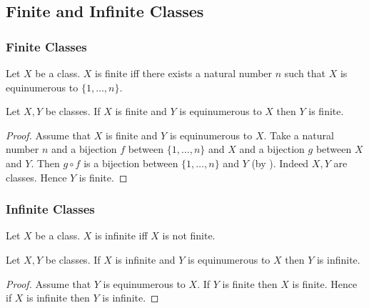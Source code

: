 \documentclass[10pt]{article}
\begin{document}
  \subsection*{Finite and Infinite Classes}

  \subsubsection*{Finite Classes}

  \begin{forthel}
    \begin{definition}
      Let $X$ be a class.
      $X$ is finite iff there exists a natural number $n$ such that $X$ is equinumerous to $\{ 1, \dots, n \}$.
    \end{definition}
  \end{forthel}

  \begin{forthel}
    \begin{proposition}
      Let $X, Y$ be classes.
      If $X$ is finite and $Y$ is equinumerous to $X$ then $Y$ is finite.
    \end{proposition}
    \begin{proof}
      Assume that $X$ is finite and $Y$ is equinumerous to $X$.
      Take a natural number $n$ and a bijection $f$ between $\{ 1, \dots, n \}$ and $X$ and a bijection $g$ between $X$ and $Y$.
      Then $g \circ f$ is a bijection between $\{ 1, \dots, n \}$ and $Y$ (by ).
      Indeed $X, Y$ are classes.
      Hence $Y$ is finite.
    \end{proof}
  \end{forthel}


  \subsubsection*{Infinite Classes}

  \begin{forthel}
    \begin{definition}
      Let $X$ be a class.
      $X$ is infinite iff $X$ is not finite.
    \end{definition}
  \end{forthel}

  \begin{forthel}
    \begin{proposition}
      Let $X, Y$ be classes.
      If $X$ is infinite and $Y$ is equinumerous to $X$ then $Y$ is infinite.
    \end{proposition}
    \begin{proof}
      Assume that $Y$ is equinumerous to $X$.
      If $Y$ is finite then $X$ is finite.
      Hence if $X$ is infinite then $Y$ is infinite.
    \end{proof}
  \end{forthel}
\end{document}
